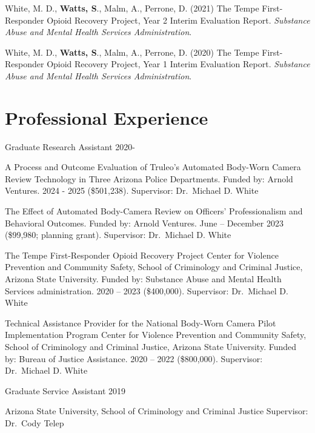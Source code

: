 \documentclass[11pt,]{article}
\begin{document}
White, M. D., \textbf{Watts, S}., Malm, A., Perrone, D. (2021) The Tempe
First-Responder Opioid Recovery Project, Year 2 Interim Evaluation
Report. \emph{Substance Abuse and Mental Health Services
Administration}.

White, M. D., \textbf{Watts, S}., Malm, A., Perrone, D. (2020) The Tempe
First-Responder Opioid Recovery Project, Year 1 Interim Evaluation
Report. \emph{Substance Abuse and Mental Health Services
Administration}.

\vspace{2mm}

\hypertarget{professional-experience}{%
\section{Professional Experience}\label{professional-experience}}

Graduate Research Assistant \hfill 2020-

A Process and Outcome Evaluation of Truleo's Automated Body-Worn Camera
Review Technology in Three Arizona Police Departments. Funded by: Arnold
Ventures. 2024 - 2025 (\$501,238). Supervisor: Dr.~Michael D. White

The Effect of Automated Body-Camera Review on Officers' Professionalism
and Behavioral Outcomes. Funded by: Arnold Ventures. June -- December
2023 (\$99,980; planning grant). Supervisor: Dr.~Michael D. White

The Tempe First-Responder Opioid Recovery Project Center for Violence
Prevention and Community Safety, School of Criminology and Criminal
Justice, Arizona State University. Funded by: Substance Abuse and Mental
Health Services administration. 2020 -- 2023 (\$400,000). Supervisor:
Dr.~Michael D. White

Technical Assistance Provider for the National Body-Worn Camera Pilot
Implementation Program Center for Violence Prevention and Community
Safety, School of Criminology and Criminal Justice, Arizona State
University. Funded by: Bureau of Justice Assistance. 2020 -- 2022
(\$800,000). Supervisor: Dr.~Michael D. White

\vspace{2mm}

Graduate Service Assistant \hfill 2019

Arizona State University, School of Criminology and Criminal Justice
Supervisor: Dr.~Cody Telep

\vspace{2mm}
\end{document}
